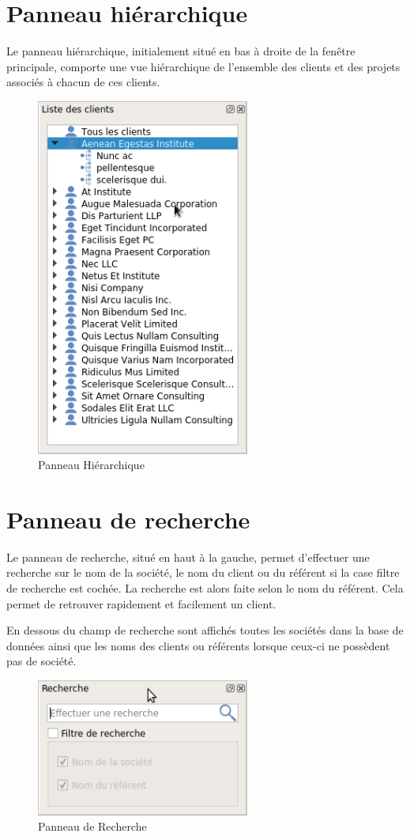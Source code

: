 \section{Panneau hiérarchique}
Le panneau hiérarchique, initialement situé en bas à droite de la fenêtre principale, comporte une vue hiérarchique de l'ensemble des clients et des projets associés à chacun de ces clients.

\begin{figure}[H]
	\centering
	\includegraphics[width=7cm]{screens/dockHierarchique.png}
	\caption{Panneau Hiérarchique}
	\label{fig:dockHierarchique}
\end{figure}

\section{Panneau de recherche}
Le panneau de recherche, situé en haut à la gauche, permet d’effectuer une recherche sur le nom de la société, le nom du client ou du référent si la case filtre de recherche est cochée. La recherche est alors faite selon le nom du référent. Cela permet de retrouver rapidement et facilement un client.

En dessous du champ de recherche sont affichés toutes les sociétés dans la base de données ainsi que les noms des clients ou référents lorsque ceux-ci ne possèdent pas de société.

\begin{figure}[H]
	\centering
	\includegraphics[width=7cm]{screens/dockRecherche.png}
	\caption{Panneau de Recherche}
	\label{fig:dockRecherche}
\end{figure}


